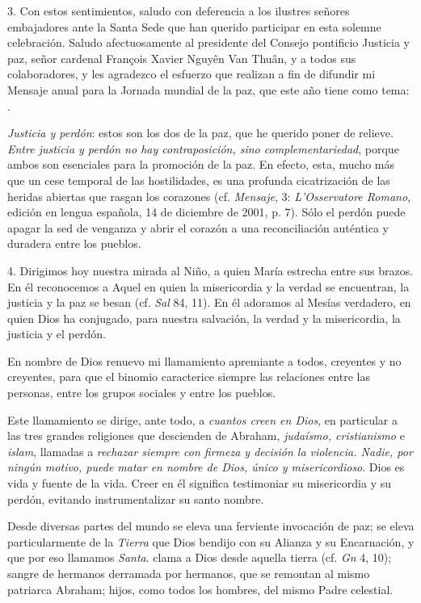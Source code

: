 3. Con estos sentimientos, saludo con deferencia a los ilustres señores embajadores ante la Santa Sede que han querido participar en esta solemne celebración. Saludo afectuosamente al presidente del Consejo pontificio Justicia y paz, señor cardenal François Xavier Nguyên Van Thuân, y a todos sus colaboradores, y les agradezco el esfuerzo que realizan a fin de difundir mi Mensaje anual para la Jornada mundial de la paz, que este año tiene como tema: .

\emph{Justicia y perdón}: estos son los dos  de la paz, que he querido poner de relieve. \emph{Entre justicia y perdón no hay contraposición, sino complementariedad}, porque ambos son esenciales para la promoción de la paz. En efecto, esta, mucho más que un cese temporal de las hostilidades, es una profunda cicatrización de las heridas abiertas que rasgan los corazones (cf. \emph{Mensaje}, 3: \emph{L'Osservatore Romano,} edición en lengua española, 14 de diciembre de 2001, p. 7). Sólo el perdón puede apagar la sed de venganza y abrir el corazón a una reconciliación auténtica y duradera entre los pueblos.

4. Dirigimos hoy nuestra mirada al Niño, a quien María estrecha entre sus brazos. En él reconocemos a Aquel en quien la misericordia y la verdad se encuentran, la justicia y la paz se besan (cf. \emph{Sal} 84, 11). En él adoramos al Mesías verdadero, en quien Dios ha conjugado, para nuestra salvación, la verdad y la misericordia, la justicia y el perdón.

En nombre de Dios renuevo mi llamamiento apremiante a todos, creyentes y no creyentes, para que el binomio  caracterice siempre las relaciones entre las personas, entre los grupos sociales y entre los pueblos.

Este llamamiento se dirige, ante todo, a \emph{cuantos creen en Dios}, en particular a las tres grandes religiones que descienden de Abraham, \emph{judaísmo, cristianismo} e \emph{islam}, llamadas a \emph{rechazar siempre con firmeza y decisión la violencia. Nadie, por ningún motivo, puede matar en nombre de Dios, único y misericordioso}. Dios es vida y fuente de la vida. Creer en él significa testimoniar su misericordia y su perdón, evitando instrumentalizar su santo nombre.

Desde diversas partes del mundo se eleva una ferviente invocación de paz; se eleva particularmente de la \emph{Tierra} que Dios bendijo con su Alianza y su Encarnación, y que por eso llamamos \emph{Santa}.  clama a Dios desde aquella tierra (cf. \emph{Gn} 4, 10); sangre de hermanos derramada por hermanos, que se remontan al mismo patriarca Abraham; hijos, como todos los hombres, del mismo Padre celestial.

